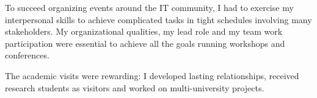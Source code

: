 \begin{minipage}{0.48\textwidth}
To succeed organizing events around the IT community,
I had to exercise my interpersonal skills to achieve
complicated tasks in tight schedules involving many stakeholders.
My organizational qualities, my lead role and my team work participation
were essential to achieve all the goals running workshops and conferences. 

\vspace*{.1cm}

The academic visits were rewarding:
I developed lasting relationships, received 
research students as visitors and worked on multi-university
projects.


\end{minipage}
\hspace*{0.6cm}

